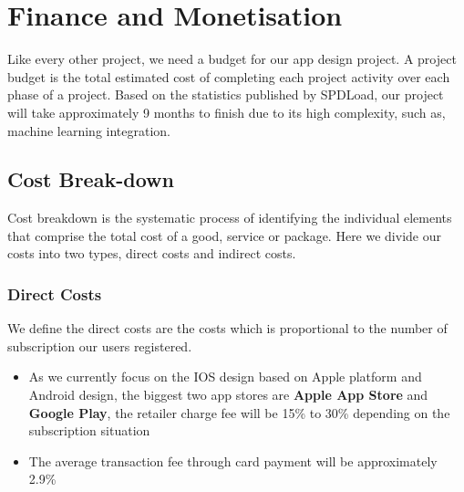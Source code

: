 \section{Finance and Monetisation}
Like every other project, we need a budget for our app design project. A project budget is the total estimated cost of completing each project activity over each phase of a project. Based on the statistics published by SPDLoad, our project will take approximately 9 months to finish due to its high complexity, such as, machine learning integration.
\subsection{Cost Break-down}
Cost breakdown is the systematic process of identifying the individual elements that comprise the total cost of a good, service or package. Here we divide our costs into two types, direct costs and indirect costs.
\subsubsection{Direct Costs}
We define the direct costs are the costs which is proportional to the number of subscription our users registered.
\begin{itemize}
\item As we currently focus on the IOS design based on Apple platform and Android design, the biggest two app stores are \textbf{Apple App Store} and \textbf{Google Play}, the retailer charge fee will be 15\% to 30\% depending on the subscription situation
\item The average transaction fee through card payment will be approximately 2.9\%
\end{itemize}


